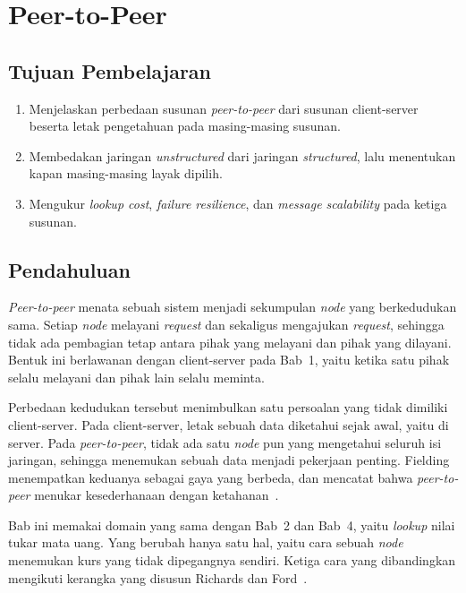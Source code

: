 \chapter{Peer-to-Peer}
\label{bab:p2p}

\section*{Tujuan Pembelajaran}

\begin{enumerate}
  \item Menjelaskan perbedaan susunan \textit{peer-to-peer} dari susunan
    client-server beserta letak pengetahuan pada masing-masing susunan.
  \item Membedakan jaringan \textit{unstructured} dari jaringan
    \textit{structured}, lalu menentukan kapan masing-masing layak dipilih.
  \item Mengukur \textit{lookup cost}, \textit{failure resilience}, dan
    \textit{message scalability} pada ketiga susunan.
\end{enumerate}

\section{Pendahuluan}

\textit{Peer-to-peer} menata sebuah sistem
menjadi sekumpulan \textit{node} yang
berkedudukan sama. Setiap \textit{node} melayani \textit{request} dan sekaligus mengajukan
\textit{request}, sehingga tidak ada pembagian tetap antara pihak yang melayani dan
pihak yang dilayani. Bentuk ini berlawanan dengan client-server
pada Bab~1,
yaitu ketika satu pihak selalu melayani dan pihak lain selalu meminta.

Perbedaan kedudukan tersebut menimbulkan satu persoalan yang tidak dimiliki
client-server. Pada client-server, letak sebuah data diketahui sejak awal,
yaitu di server. Pada \textit{peer-to-peer}, tidak ada satu \textit{node} pun yang
mengetahui seluruh isi jaringan, sehingga menemukan sebuah data menjadi
pekerjaan penting. Fielding menempatkan keduanya sebagai gaya yang berbeda,
dan mencatat bahwa \textit{peer-to-peer} menukar kesederhanaan dengan
ketahanan~\cite{fielding2000architectural}.

Bab ini memakai domain yang sama dengan Bab~2 dan Bab~4, yaitu
\textit{lookup} nilai
tukar mata uang. Yang berubah hanya satu hal, yaitu cara sebuah \textit{node}
menemukan kurs yang tidak dipegangnya sendiri. Ketiga cara yang dibandingkan
mengikuti kerangka yang disusun Richards dan
Ford~\cite{richards2020fundamentals}.

